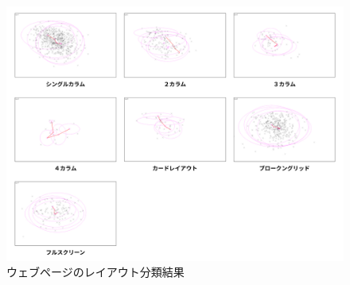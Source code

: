 \begin{figure}[H]
  \centering
  \includegraphics[width=12cm]{figures/05_layout_result.jpg}
  \caption{ウェブページのレイアウト分類結果}
  \label{fig_layout_result}
\end{figure}